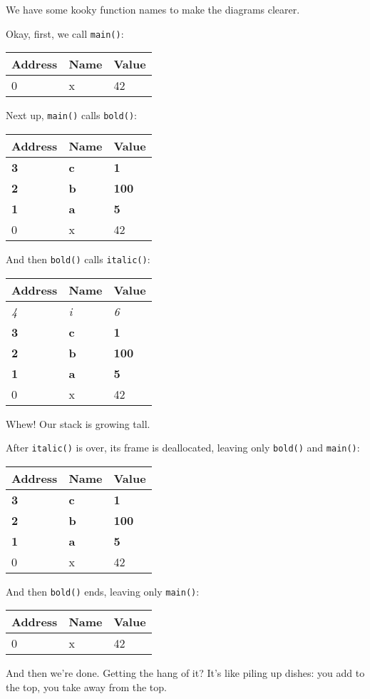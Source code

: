 \documentclass[a4paper,]{book}
\begin{document}
We have some kooky function names to make the diagrams clearer.

Okay, first, we call \texttt{main()}:

\begin{longtable}[]{@{}lll@{}}
\toprule
Address & Name & Value\tabularnewline
\midrule
\endhead
0 & x & 42\tabularnewline
\bottomrule
\end{longtable}

Next up, \texttt{main()} calls \texttt{bold()}:

\begin{longtable}[]{@{}lll@{}}
\toprule
Address & Name & Value\tabularnewline
\midrule
\endhead
\textbf{3} & \textbf{c} & \textbf{1}\tabularnewline
\textbf{2} & \textbf{b} & \textbf{100}\tabularnewline
\textbf{1} & \textbf{a} & \textbf{5}\tabularnewline
0 & x & 42\tabularnewline
\bottomrule
\end{longtable}

And then \texttt{bold()} calls \texttt{italic()}:

\begin{longtable}[]{@{}lll@{}}
\toprule
Address & Name & Value\tabularnewline
\midrule
\endhead
\emph{4} & \emph{i} & \emph{6}\tabularnewline
\textbf{3} & \textbf{c} & \textbf{1}\tabularnewline
\textbf{2} & \textbf{b} & \textbf{100}\tabularnewline
\textbf{1} & \textbf{a} & \textbf{5}\tabularnewline
0 & x & 42\tabularnewline
\bottomrule
\end{longtable}

Whew! Our stack is growing tall.

After \texttt{italic()} is over, its frame is deallocated, leaving only
\texttt{bold()} and \texttt{main()}:

\begin{longtable}[]{@{}lll@{}}
\toprule
Address & Name & Value\tabularnewline
\midrule
\endhead
\textbf{3} & \textbf{c} & \textbf{1}\tabularnewline
\textbf{2} & \textbf{b} & \textbf{100}\tabularnewline
\textbf{1} & \textbf{a} & \textbf{5}\tabularnewline
0 & x & 42\tabularnewline
\bottomrule
\end{longtable}

And then \texttt{bold()} ends, leaving only \texttt{main()}:

\begin{longtable}[]{@{}lll@{}}
\toprule
Address & Name & Value\tabularnewline
\midrule
\endhead
0 & x & 42\tabularnewline
\bottomrule
\end{longtable}

And then we're done. Getting the hang of it? It's like piling up dishes:
you add to the top, you take away from the top.
\end{document}
